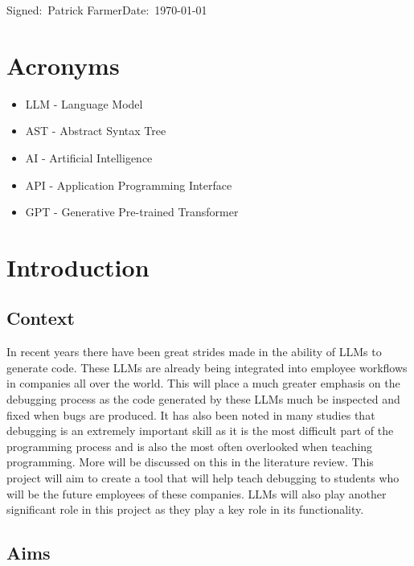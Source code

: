 \documentclass[12pt]{extarticle}
\begin{document}
\small Signed:~Patrick Farmer\hfill Date:~\today

\newpage
\tableofcontents

\newpage
\section*{Acronyms}

\begin{itemize}
    \item LLM - Language Model
    \item AST - Abstract Syntax Tree
    \item AI - Artificial Intelligence
    \item API - Application Programming Interface
    \item GPT - Generative Pre-trained Transformer
\end{itemize}
\newpage
\section{Introduction}

\subsection{Context}

In recent years there have been great strides made in the ability of LLMs to generate code. These LLMs are already being integrated into employee workflows in companies all over the world. This will place a much greater emphasis on the debugging process as the code generated by these LLMs much be inspected and fixed when bugs are produced. It has also been noted in many studies that debugging is an extremely important skill as it is the most difficult part of the programming process and is also the most often overlooked when teaching programming. More will be discussed on this in the literature review. This project will aim to create a tool that will help teach debugging to students who will be the future employees of these companies. LLMs will also play another significant role in this project as they play a key role in its functionality.

\subsection{Aims}
\end{document}
